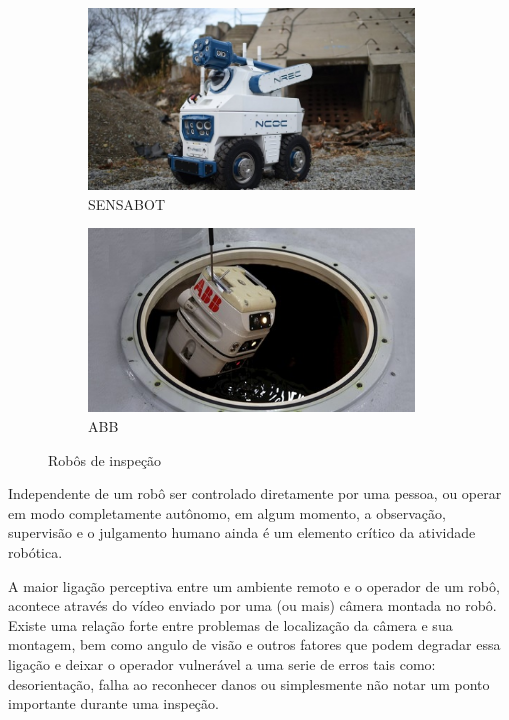 \begin{figure}[H]
	\centering
	\begin{subfigure}{.5\textwidth}
		\includegraphics[width=0.95\textwidth]{figuras/sensabot.jpg}
		\caption{SENSABOT}
		\label{fig:sensabot}
	\end{subfigure}%
	\begin{subfigure}{.5\textwidth}
		\includegraphics[width=0.95\textwidth]{figuras/abb.jpg}
		\caption{ABB}
		\label{fig:abb}
	\end{subfigure}
	\caption{Robôs de inspeção}
\end{figure}

Independente de um robô ser controlado diretamente por uma pessoa, ou operar em modo completamente autônomo, em algum momento, a observação, supervisão e o julgamento humano ainda é um elemento crítico da atividade robótica.\par

A maior ligação perceptiva entre um ambiente remoto e o operador de um robô, acontece através do vídeo enviado por uma (ou mais) câmera montada no robô. Existe uma relação forte entre problemas de localização da câmera e sua montagem, bem como angulo de visão e outros fatores que podem degradar essa ligação e deixar o operador vulnerável a uma serie de erros tais como: desorientação, falha ao reconhecer danos ou simplesmente não notar um ponto importante durante uma inspeção.\par

